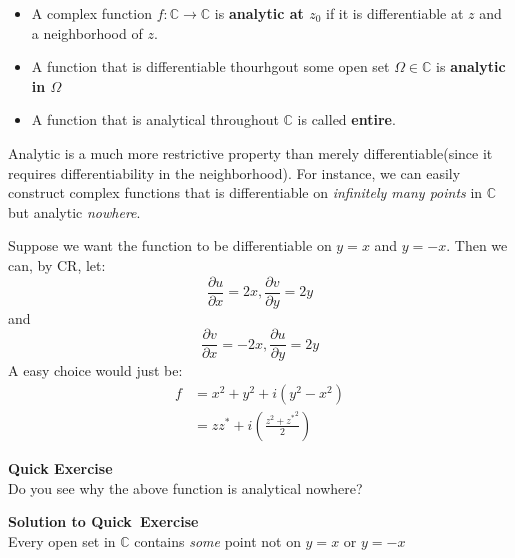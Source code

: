 \begin{definition}\begin{itemize}
\item A complex function $f:\mathbb{C} \to \mathbb{C}$ is \textbf{analytic at $z_0$} if it is differentiable at $z$ and a neighborhood of $z$.
\item A function that is differentiable thourhgout some open set $\Omega \in \mathbb{C}$ is \textbf{analytic in $\Omega$}
\item A function that is analytical throughout $\mathbb{C}$ is called \textbf{entire}.
\end{itemize}

\end{definition}Analytic is a much more restrictive property than merely differentiable(since it requires differentiability in the neighborhood). For instance, we can easily construct complex functions that is differentiable on \textit{infinitely many points} in $\mathbb{C}$ but analytic \textit{nowhere}.

\begin{example}Suppose we want the function to be differentiable on $y=x$ and $y= -x$. Then we can, by CR, let:
\begin{equation}
\frac{\partial u}{\partial x} =2x, \frac{\partial v}{\partial y} = 2y
\end{equation}
and
\begin{equation}
\frac{\partial v}{\partial x} =-2x, \frac{\partial u}{\partial y} = 2y
\end{equation}
A easy choice would just be:
\begin{equation}
\begin{aligned}
f&=x^2+y^2 +i(y^2-x^2) \\
&= zz^*+i\left(\frac{z^2+{z^*}^2}{2}\right)
\end{aligned}
\end{equation}

\end{example}\begin{framed}
\textbf{Quick Exercise}\\
Do you see why the above function is analytical nowhere?
\end{framed}

\begin{framed}
\textbf{Solution to Quick~Exercise}\\
Every open set in $\mathbb{C}$ contains \textit{some} point not on $y=x$ or $y= -x$
\end{framed}